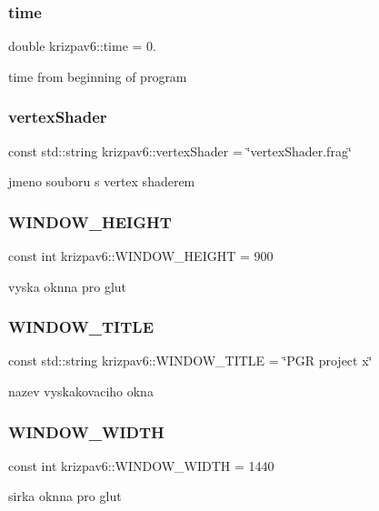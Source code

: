 \subsubsection{\texorpdfstring{time}{time}}
{\footnotesize\ttfamily double krizpav6\+::time = 0.}



time from beginning of program 

\mbox{\label{namespacekrizpav6_a4f2044c6c1b0a084461ed44c4e5fb4ee}} 
\subsubsection{\texorpdfstring{vertexShader}{vertexShader}}
{\footnotesize\ttfamily const std\+::string krizpav6\+::vertex\+Shader = \char`\"{}vertex\+Shader.\+frag\char`\"{}}



jmeno souboru s vertex shaderem 

\mbox{\label{namespacekrizpav6_a2313e1f501c5b7fb52ad5829054c4c50}} 
\subsubsection{\texorpdfstring{WINDOW\_HEIGHT}{WINDOW\_HEIGHT}}
{\footnotesize\ttfamily const int krizpav6\+::\+W\+I\+N\+D\+O\+W\+\_\+\+H\+E\+I\+G\+HT = 900}



vyska oknna pro glut 

\mbox{\label{namespacekrizpav6_a3478998e0f4100e6f5aaf6f26180004a}} 
\subsubsection{\texorpdfstring{WINDOW\_TITLE}{WINDOW\_TITLE}}
{\footnotesize\ttfamily const std\+::string krizpav6\+::\+W\+I\+N\+D\+O\+W\+\_\+\+T\+I\+T\+LE = \char`\"{}P\+GR project x\char`\"{}}



nazev vyskakovaciho okna 

\mbox{\label{namespacekrizpav6_ac1e06653bf2ce46f48d6eb481d133cf7}} 
\subsubsection{\texorpdfstring{WINDOW\_WIDTH}{WINDOW\_WIDTH}}
{\footnotesize\ttfamily const int krizpav6\+::\+W\+I\+N\+D\+O\+W\+\_\+\+W\+I\+D\+TH = 1440}



sirka oknna pro glut 

